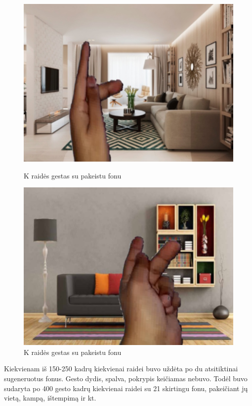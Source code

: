 \documentclass{VUMIFInfKursinis}
\begin{document}
\begin{figure}[H]
	\begin{minipage}{.5\textwidth}
		\centering
		\includegraphics[width=.8\linewidth]{img/K1}
		\caption{K raidės gestas su pakeistu fonu}
		\label{img:a-sign-first}
	\end{minipage}\hspace{\fill}%
	\begin{minipage}{.5\textwidth}
		\centering
		\includegraphics[width=.8\linewidth]{img/K2}
		\caption{K raidės gestas su pakeistu fonu}
		\label{img:a-sign-second}
	\end{minipage}\hspace{\fill}%
\end{figure}

Kiekvienam iš 150-250 kadrų kiekvienai raidei buvo uždėta po du atsitiktinai sugeneruotus fonus. Gesto dydis, spalva, pokrypis keičiamas nebuvo. Todėl buvo sudaryta po 400 gesto kadrų kiekvienai raidei su 21 skirtingu fonu, pakeičiant jų vietą, kampą, ištempimą ir kt.
\end{document}
